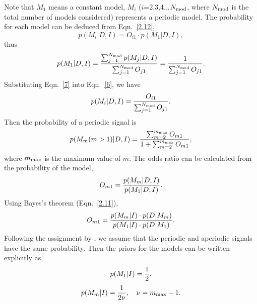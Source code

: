 \documentclass[fleqn,usenatbib]{mnras}
\begin{document}
Note that $M_1$ means a constant model, $M_i$ ($i$=2,3,4...$N_{\rm mod}$, where $N_{\rm mod}$ is the total number of models considered) represents a periodic model. The probability for each model can be deduced from Eqn.~\ref{2.12},
\begin{equation}\label{6}
p(M_i|D,I)=O_{i1}\cdot p(M_1|D,I),
\end{equation}
thus
\begin{equation}\label{7}
p(M_1|D,I)={{\sum_{j=1}^{N_{\rm mod}} p(M_j|D,I)}\over {\sum_{j=1}^{N_{\rm mod}} O_{j1}}}
={1\over {\sum_{j=1}^{N_{\rm mod}} O_{j1}}}.
\end{equation}
Substituting Eqn.~\ref{7} into Eqn.~\ref{6}, we have
\begin{equation}\label{2.13}
p(M_i|D,I)={O_{i1}\over {\sum_{j=1}^{N_{\rm mod}} O_{j1}}}.
\end{equation}
Then the probability of a periodic signal is
\begin{equation}\label{5.2}
p(M_m(m>1)|D,I)={{\sum_{m=2}^{m_{\rm max}} O_{m1}}\over {1+\sum_{m=2}^{m_{\rm max}} O_{m1}}},
\end{equation}
where $m_{\rm max}$ is the maximum value of $m$.
The odds ratio can be calculated from the probability of the model,
\begin{equation}
O_{m1}={{p(M_m|D,I)}\over {p(M_1|D,I)}}.
\end{equation}
Using Bayes's theorem (Eqn.~\ref{2.11}), 
\begin{equation}\label{11}
O_{m1}={{p(M_m|I)\cdot p(D|M_m)}\over {p(M_1|I)\cdot p(D|M_1)}}.
\end{equation}
Following the assignment by \citet{1992ApJ...398..146G}, we assume that the periodic and aperiodic signals have the same probability. Then the priors for the models can be written explicitly as,
\begin{equation}\label{12}
p(M_1|I)={1\over 2},	
\end{equation}
\begin{equation}\label{13}
p(M_m|I)={1\over {2\nu}}, \quad \nu =m_{\rm max}-1.
\end{equation}
\end{document}
